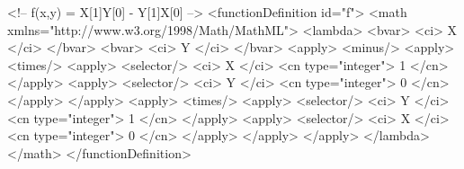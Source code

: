 \begin{example}
<!-- f(x,y) = X[1]Y[0] - Y[1]X[0] -->
<functionDefinition id="f">
    <math
        xmlns="http://www.w3.org/1998/Math/MathML">
        <lambda>
            <bvar>
                <ci> X </ci>
            </bvar>
            <bvar>
                <ci> Y </ci>
            </bvar>
            <apply>
                <minus/>
                <apply>
                    <times/>
                    <apply>
                        <selector/>
                        <ci> X </ci>
                        <cn type="integer"> 1 </cn>
                    </apply>
                    <apply>
                        <selector/>
                        <ci> Y </ci>
                        <cn type="integer"> 0 </cn>
                    </apply>
                </apply>
                <apply>
                    <times/>
                    <apply>
                        <selector/>
                        <ci> Y </ci>
                        <cn type="integer"> 1 </cn>
                    </apply>
                    <apply>
                        <selector/>
                        <ci> X </ci>
                        <cn type="integer"> 0 </cn>
                    </apply>
                </apply>
            </apply>
        </lambda>
    </math>
</functionDefinition>
\end{example}
